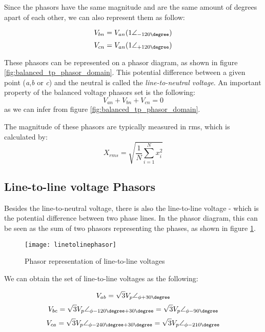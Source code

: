 Since the phasors have the same magnitude and are the same amount of degrees apart of each other, we can also represent them as follow:

\begin{equation} \label{eq:balanced_Vbn2}
	V_{bn} = V_{an}(1\angle_{-120\degree})
\end{equation}
\begin{equation} \label{eq:balanced_Vcn2}
	V_{cn} = V_{an}(1\angle_{+120\degree})
\end{equation}

These phasors can be represented on a phasor diagram, as shown in figure \ref{fig:balanced_tp_phasor_domain}. This potential difference between a given point (\emph{a},\emph{b} or \emph{c}) and the neutral is called the \emph{line-to-neutral voltage}. 
An important property of the balanced voltage phasors set is the following:
\begin{equation} \label{eq:balanced_prop1}
	V_{an} + V_{bn} + V_{cn} = 0
\end{equation}
as we can infer from figure \ref{fig:balanced_tp_phasor_domain}.

The magnitude of these phasors are typically measured in \acrfull{rms}, which is calculated by:
\begin{equation} \label{eq:rms}
	X_{rms} = \sqrt{\frac{1}{N}\sum\limits_{i=1}^{N}x_{i}^2}
\end{equation}

\subsection{Line-to-line voltage Phasors}

Besides the line-to-neutral voltage, there is also the line-to-line voltage - which is the potential difference between two phase lines.
In the phasor diagram, this can be seen as the sum of two phasors representing the phases, as shown in figure \ref{fig:line_to_line_phasors}.


\begin{figure}[htbp]
	\centering
	\texttt{[image: linetolinephasor]}
	\caption{Phasor representation of line-to-line voltages}
	\label{fig:line_to_line_phasors}
\end{figure}

We can obtain the set of line-to-line voltages as the following:

\begin{equation} \label{eq:balanced_tpVab}
	V_{ab} = \sqrt{3}V_{p}\angle_{\phi+30\degree}
\end{equation}
\begin{equation} \label{eq:balanced_tpVbc}
	V_{bc} = \sqrt{3}V_{p}\angle_{\phi - 120\degree + 30\degree} = \sqrt{3}V_{p}\angle_{\phi - 90\degree}
\end{equation}
\begin{equation} \label{eq:balanced_tpVca}
	V_{ca} = \sqrt{3}V_{p}\angle_{\phi - 240\degree + 30\degree} = \sqrt{3}V_{p}\angle_{\phi -210\degree} 
\end{equation}

